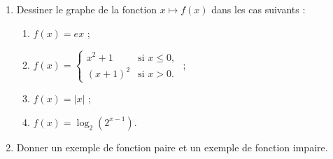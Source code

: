 
\begin{exercice}\label{exointerro-0002}

  \begin{enumerate}
  \item Dessiner le graphe de la fonction $x\mapsto f(x)$ dans les cas suivants :
    \begin{enumerate}
    \item 
      $\displaystyle f(x)= e x$ ;
    \item
      $\displaystyle f(x)= \left\{
      \begin{array}{ll}
        x^2+1 & \textrm{si } x\leq 0,\\
        (x+1)^2 & \textrm{si } x>0.
      \end{array}
      \right.$ ;
    \item 
      $\displaystyle f(x)= |x|$ ;
    \item
      $\displaystyle f(x)= \log_2(2^{x-1})$.
    \end{enumerate}
    \item Donner un exemple de fonction paire et un exemple de fonction impaire. 
  \end{enumerate}


\end{exercice}
